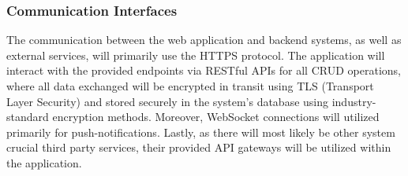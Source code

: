 \subsubsection{Communication Interfaces}
The communication between the web application and backend systems, as well as external services, will primarily use the HTTPS protocol. The application will interact with the provided endpoints via RESTful APIs for all CRUD operations, where all data exchanged will be encrypted in transit using TLS (Transport Layer Security) and stored securely in the system's database using industry-standard encryption methods. Moreover, WebSocket connections will utilized primarily for push-notifications. Lastly, as there will most likely be other system crucial third party services, their provided API gateways will be utilized within the application.
